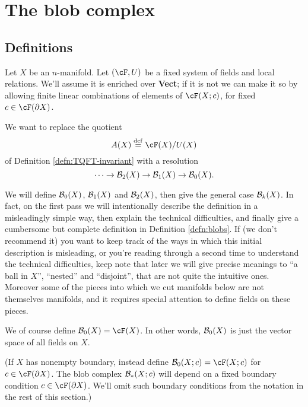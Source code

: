 
\section{The blob complex}
\subsection{Definitions}
\label{sec:blob-definition}
Let $X$ be an $n$-manifold.
Let $(\cF,U)$ be a fixed system of fields and local relations.
We'll assume it is enriched over \textbf{Vect}; 
if it is not we can make it so by allowing finite
linear combinations of elements of $\cF(X; c)$, for fixed $c\in \cF(\bd X)$.


We want to replace the quotient
\[
	A(X) \deq \cF(X) / U(X)
\]
of Definition \ref{defn:TQFT-invariant} with a resolution
\[
	\cdots \to {\mathcal B}_2(X) \to {\mathcal B}_1(X) \to {\mathcal B}_0(X) .
\]

We will define ${\mathcal B}_0(X)$, ${\mathcal B}_1(X)$ and ${\mathcal B}_2(X)$, then give the general case ${\mathcal B}_k(X)$. 
In fact, on the first pass we will intentionally describe the definition in a misleadingly simple way, 
then explain the technical difficulties, and finally give a cumbersome but complete definition in 
Definition \ref{defn:blobs}. 
If (we don't recommend it) you want to keep track of the ways in which 
this initial description is misleading, or you're reading through a second time to understand the 
technical difficulties, keep note that later we will give precise meanings to ``a ball in $X$'', 
``nested'' and ``disjoint'', that are not quite the intuitive ones. 
Moreover some of the pieces 
into which we cut manifolds below are not themselves manifolds, and it requires special attention 
to define fields on these pieces.

We of course define $\bc_0(X) = \cF(X)$.
In other words, ${\mathcal B}_0(X)$ is just the vector space of all fields on $X$.

(If $X$ has nonempty boundary, instead define $\bc_0(X; c) = \cF(X; c)$ for $c \in \cF(\bdy X)$.
The blob complex ${\mathcal B}_*(X; c)$ will depend on a fixed boundary condition $c\in \cF(\bdy X)$.
We'll omit such boundary conditions from the notation in the rest of this section.)

